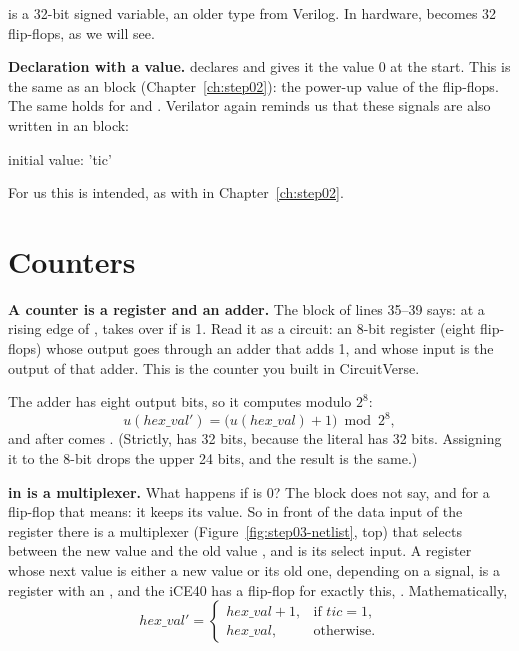 \textbf{} is a 32-bit signed variable, an older type from Verilog.
In hardware,  becomes 32 flip-flops, as we will see.

\textbf{Declaration with a value.}  declares  and
gives it the value 0 at the start. This is the same as an  block
(Chapter~\ref{ch:step02}): the power-up value of the flip-flops. The same
holds for  and . Verilator again reminds us that
these signals are also written in an  block:
\begin{terminal}
initial value: 'tic'
\end{terminal}
For us this is intended, as with  in Chapter~\ref{ch:step02}.

\section{Counters}
\label{sec:step03-counter}

\textbf{A counter is a register and an adder.} The block of lines 35--39 says:
at a rising edge of ,  takes over  if
 is 1. Read it as a circuit: an 8-bit register (eight flip-flops)
whose output goes through an adder that adds 1, and whose input is the output
of that adder. This is the counter you built in CircuitVerse.

The adder has eight output bits, so it computes modulo $2^8$:
\[
  u(\mathit{hex\_val}') = \bigl(u(\mathit{hex\_val}) + 1\bigr) \bmod 2^8 ,
\]
and after  comes . (Strictly,  has 32 bits,
because the literal  has 32 bits. Assigning it to the 8-bit 
drops the upper 24 bits, and the result is the same.)

\textbf{ in  is a multiplexer.} What happens if 
is 0? The block does not say, and for a flip-flop that means: it keeps its
value. So in front of the data input of the register there is a multiplexer
(Figure~\ref{fig:step03-netlist}, top) that selects between the new value
 and the old value , and  is its select
input. A register whose next value is either a new value or its old one,
depending on a signal, is a register with an , and the iCE40 has
a flip-flop for exactly this, . Mathematically,
\[
  \mathit{hex\_val}' =
  \begin{cases}
    \mathit{hex\_val} + 1, & \text{if } \mathit{tic} = 1,\\
    \mathit{hex\_val}, & \text{otherwise.}
  \end{cases}
\]

